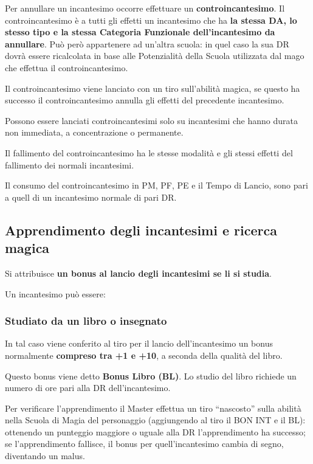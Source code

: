 Per annullare un incantesimo occorre effettuare un
\textbf{controincantesimo}. Il controincantesimo \`e a tutti gli
effetti un incantesimo che ha \textbf{la stessa DA, lo stesso tipo e
  la stessa Categoria Funzionale dell'incantesimo da annullare}.
Pu\`o per\`o appartenere ad un'altra scuola: in quel caso la sua
DR dovr\`a essere ricalcolata in base alle Potenzialit\`a della
Scuola utilizzata dal mago che effettua il controincantesimo.

Il controincantesimo viene lanciato con un tiro sull'abilit\`a
magica, se questo ha successo il controincantesimo annulla gli effetti
del precedente incantesimo.

Possono essere lanciati controincantesimi solo su incantesimi
che hanno durata non immediata, a concentrazione o permanente.

Il fallimento del controincantesimo ha le stesse modalit\`a e gli stessi effetti
del fallimento dei normali incantesimi.

Il consumo del controincantesimo in PM, PF, PE e il Tempo di Lancio, 
sono pari a quell di un incantesimo normale di pari DR.

\subsection{Apprendimento degli incantesimi e ricerca magica}

\label{ricercamagica}
Si attribuisce \textbf{un bonus al lancio degli incantesimi se li si
  studia}.

Un incantesimo pu\`o essere:

\subsubsection{Studiato da un libro o insegnato} In
tal caso viene conferito al tiro per il lancio dell'incantesimo un
bonus normalmente \textbf{compreso tra +1 e +10}, a seconda della qualit\`a
del libro. 

Questo bonus viene detto \textbf{Bonus Libro (BL)}. Lo studio del
libro richiede un numero di ore pari alla DR dell'incantesimo. 

Per verificare l'apprendimento il Master effettua un tiro ``nascosto''
sulla abilit\`a nella Scuola di Magia del personaggio (aggiungendo
al tiro il BON INT e il BL): ottenendo un punteggio maggiore o uguale
alla DR l'apprendimento ha successo; se l'apprendimento fallisce, il
bonus per quell'incantesimo cambia di segno, diventando un malus. 

